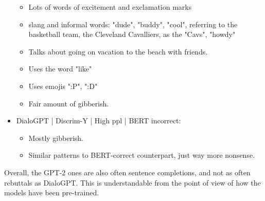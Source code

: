 \begin{itemize}
    \begin{itemize}
        \item Lots of words of excitement and exclamation marks
        \item slang and informal words: "dude", "buddy", "cool", referring to the basketball team, the Cleveland Cavalliers, as the "Cavs", "howdy"
        \item Talks about going on vacation to the beach with friends.
        \item Uses the word "like"
        \item Uses emojis ":P", ":D"
        \item Fair amount of gibberish.
    \end{itemize}
    \item DialoGPT | Discrim-Y | High ppl | BERT incorrect:
    \begin{itemize}
        \item Mostly gibberish.
        \item Similar patterns to BERT-correct counterpart, just way more nonsense.
    \end{itemize}
\end{itemize}

Overall, the GPT-2 ones are also often sentence completions, and not as often rebuttals as DialoGPT. This is understandable from the point of view of how the models have been pre-trained.